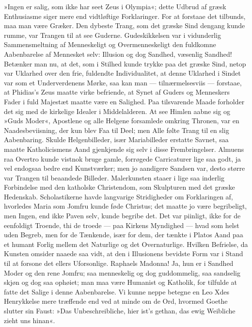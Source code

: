 \documentclass[12pt]{book}
\newcommand{\apage}[1]{\marginnote{\footnotesize\textit{[#1]}}}
\begin{document}
»Ingen er salig, som ikke har seet Zeus i Olympia«; dette Udbrud af græsk
Enthusiasme siger mere end vidtløftige Forklaringer. For at forstaae det
tilbunds, maa man være Græker. Den dybeste Trang, som det græske Sind dengang
kunde rumme, var Trangen til at see Guderne. Gudeskikkelsen var i vidunderlig
Sammensmeltning af Menneskeligt og Overmenneskeligt den fuldkomne
Aabenbarelse af Mennesket selv: Illusion og dog Sandhed, væsenlig Sandhed!
Betænker man nu, at det, som i Stilhed kunde trykke paa det græske Sind, netop
var Uklarhed over den frie, fuldendte Individualitet, at denne Uklarhed i
Sindet var som et Underverdenens Mørke, saa kan man --- tilnærmelsesviis --- forstaae,
at \apage{250} Phidias's Zeus maatte virke befriende, at Synet af Guders og Menneskers
Fader i fuld Majestæt maatte være en Salighed. Paa tilsvarende Maade forholder
det sig med de kirkelige Idealer i Middelalderen. At see Himlen aabne sig og
»Guds Moder«, Apostlene og alle Helgene forsamlede omkring Thronen, var en
Naadesbeviisning, der kun blev Faa til Deel; men Alle følte Trang til en slig
Aabenbaring. Skulde Helgenbilleder, især Mariabilleder erstatte Savnet, saa
maatte Katholicismens Aand gjenkjende sig selv i disse Frembringelser. Almuens
raa Overtro kunde vistnok bruge gamle, forrøgede Carricaturer lige saa godt,
ja vel endogsaa bedre end Kunstværker; men jo aandigere Sandsen var, desto
større var Trangen til beaandede Billeder. Malerkunsten staaer i lige saa
inderlig Forbindelse med den katholske Christendom, som Skulpturen med det
græske Hedenskab. Scholastikerne havde langvarige Stridigheder om Forklaringen
af, hvorledes Maria som Jomfru kunde føde Christus; det maatte jo være
begribeligt, men Ingen, end ikke Paven selv, kunde begribe det. Det var
piinligt, ikke for de eenfoldigt Troende, thi de troede --- paa Kirkens Myndighed
--- hvad som helst uden Begreb, men for de Tænkende, især for dem, der tænkte
i Platos Aand paa et humant Forlig mellem det Naturlige og det Overnaturlige.
Hvilken Befrielse, da Kunsten omsider naaede saa vidt, at den i Illusionens
bevidste Form var i Stand til at forsone det ellers Uforsonlige. Raphaels
Madonna! Ja, hun er i Sandhed Moder og den rene Jomfru; saa menneskelig og
dog  \apage{251} guddommelig, saa sandselig skjøn og dog saa ophøiet; man maa være Humanist
og Katholik, for tilfulde at fatte det Salige i denne Aabenbarelse. Vi kunne
neppe betegne en Leo Xdes Henrykkelse mere træffende end ved at minde om de
Ord, hvormed Goethe slutter sin Faust: »Das Unbeschreibliche, hier
ist's gethan, das ewig Weibliche zieht uns hinan«.
\end{document}
